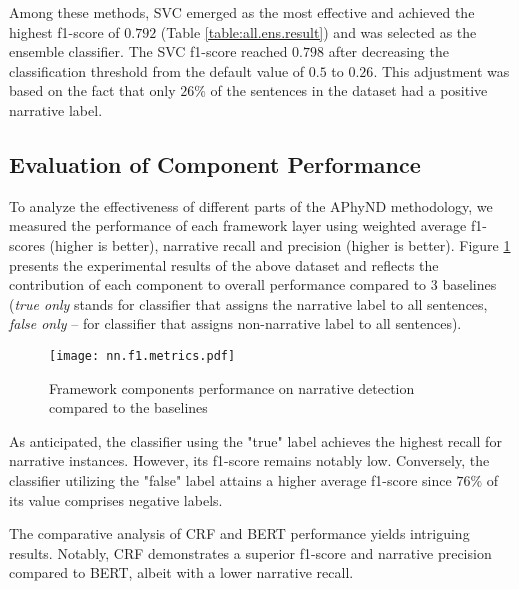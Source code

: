 \documentclass[preprint,12pt]{elsarticle}
\begin{document}
Among these methods, SVC emerged as the most effective and achieved the highest f1-score of $0.792$ (Table \ref{table:all.ens.result}) and was selected as the ensemble classifier. 
The SVC f1-score reached $0.798$ after decreasing the classification threshold from the default value of $0.5$ to $0.26$. This adjustment was based on the fact that only $26\%$ of the sentences in the dataset had a positive narrative label. 

\subsection{Evaluation of Component Performance} \label{sec:Component Performance}

To analyze the effectiveness of different parts of the APhyND methodology, we measured the performance of each framework layer using weighted average f1-scores (higher is better), narrative recall and precision (higher is better). Figure \ref{fig:layers.impact} presents the experimental results of the above dataset and reflects the contribution of each component to overall performance compared to $3$ baselines (\emph{true only} stands for classifier that assigns the narrative label to all sentences, \emph{false only} -- for classifier that assigns non-narrative label to all sentences).

\begin{figure}[ht]
\centering
\texttt{[image: nn.f1.metrics.pdf]}
\caption{Framework components performance on narrative detection compared to the baselines}
\label{fig:layers.impact}
\end{figure}

As anticipated, the classifier using the "true" label achieves the highest recall for narrative instances. However, its f1-score remains notably low. Conversely, the classifier utilizing the "false" label attains a higher average f1-score since $76\%$ of its value comprises negative labels.

The comparative analysis of CRF and BERT performance yields intriguing results. Notably, CRF demonstrates a superior f1-score and narrative precision compared to BERT, albeit with a lower narrative recall.
\end{document}
